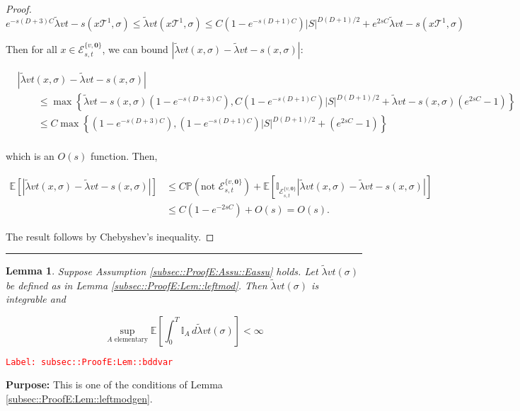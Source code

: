 \documentclass[12pt]{article}
\newcommand{\mb}{\mathbb}
\newcommand{\mc}{\mathcal}
\newcommand{\te}{\text}
\newcommand{\tr}{\textcolor{red}}
\newcommand{\labe}[1]{\tr{\texttt{Label: #1}}}
\newcommand{\purpose}{\textbf{Purpose: }}
\newcommand{\lin}{\rule{\linewidth}{0.4 pt}}
\newcommand{\pr}{\mb{P}}							%
\newcommand{\ex}[1]{\mb{E}\left[#1\right]}			%
\renewcommand{\root}{\mathbf{0}}				%
\renewcommand{\v}{v}							%
\renewcommand{\S}{S}							%
\newcommand{\s}{\sigma}							%
\newcommand{\T}{T}								%
\newcommand{\x}{x}								%
\renewcommand{\t}{t}							%
\renewcommand{\tt}{s}							%
\newcommand{\const}{C}							%
\newcommand{\degr}{D}							%
\newcommand{\tree}{\mc{T}}						%
\newcommand{\sln}[1]{^{#1}}						%
\newcommand{\alt}[1]{\widetilde{#1}}			%
\newcommand{\evnt}{\mc{E}}						%
\newcommand{\typset}{A}							%
\newcommand{\crate}{\alt{\lambda}}				%
\newtheorem{lem}[thms]{Lemma}
\begin{document}
\begin{proof}
\[e^{-\tt(\degr+3)\const{}}\crate{\v}{\t-\tt}(\x{\tree\sln{1}}{},\s) \leq \crate{\v}{\t}(\x{\tree\sln{1}}{},\s) \leq \const{}(1 - e^{-\tt(\degr+1)\const{}})|\S|^{\degr(\degr+1)/2} + e^{2\tt\const{}}\crate{\v}{\t-\tt}(\x{\tree\sln{1}}{},\s)\]

Then for all \(\x{}{} \in \evnt{}^{\{\v,\root\}}_{\tt,\t}\), we can bound \(|\crate{\v}{\t}(\x{}{},\s) - \crate{\v}{\t-\tt}(\x{}{},\s)|\):

\begin{align*}
&|\crate{\v}{\t}(\x{}{},\s) - \crate{\v}{\t-\tt}(\x{}{},\s)| \\
&\hspace{24pt}\leq \max\left\{\crate{\v}{\t-\tt}(\x{}{},\s)\left(1 - e^{-\tt(\degr+3)\const{}}\right),\const{}(1-e^{-\tt(\degr+1)\const{}})|\S|^{\degr(\degr+1)/2} + \crate{\v}{\t-\tt}(\x{}{},\s)\left(e^{2\tt\const{}} - 1\right)\right\}\\
&\hspace{24pt}\leq \const{}\max\left\{\left(1 - e^{-\tt(\degr+3)\const{}}\right),(1-e^{-\tt(\degr+1)\const{}})|\S|^{\degr(\degr+1)/2} + \left(e^{2\tt\const{}} - 1\right)\right\}\\
\end{align*}

which is an \(O(\tt)\) function. Then,

\begin{align*}
\ex{|\crate{\v}{\t}(\x{}{},\s) - \crate{\v}{\t-\tt}(\x{}{},\s)|} &\leq \const{}\pr\left(\te{not }\evnt{}^{\{\v,\root\}}_{\tt,\t}\right) + \ex{\mb{I}_{\evnt{}^{\{\v,\root\}}_{\tt,\t}}|\crate{\v}{\t}(\x{}{},\s) - \crate{\v}{\t-\tt}(\x{}{},\s)|}\\
&\leq \const{}(1 - e^{-2\tt\const{}}) + O(\tt) = O(\tt).
\end{align*}

The result follows by Chebyshev's inequality.
\end{proof}

\lin

\begin{lem}
Suppose Assumption \ref{subsec::ProofE:Assu::Eassu} holds. Let \(\crate{\v}{\t}(\s)\) be defined as in Lemma \ref{subsec::ProofE:Lem::leftmod}. Then \(\crate{\v}{\t}(\s)\) is integrable and 

\[\sup_{\typset\te{ elementary}} \ex{\int_0^\T \mb{I}_\typset\,d\crate{\v}{\t}(\s)} < \infty\]
\label{subsec::ProofE:Lem::bddvar}
\end{lem}
\labe{subsec::ProofE:Lem::bddvar}

\purpose This is one of the conditions of Lemma \ref{subsec::ProofE:Lem::leftmodgen}.
\end{document}
